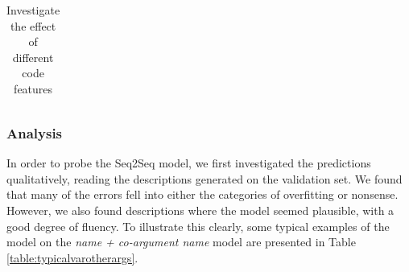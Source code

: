 \begin{table}[!ht]
\begin{center}
\begin{tabular}{ c | c | c }
    
    \hline
\end{tabular}
\caption {Investigate the effect of different code features}
\label{table:tokenization}
\end{center}
\end{table}


\subsubsection{Analysis} %
\label{ssub:analysis}

In order to probe the Seq2Seq model, we first investigated the predictions qualitatively, reading the descriptions generated on the validation set. 
We found that many of the errors fell into either the categories of overfitting or nonsense. 
However, we also found descriptions where the model seemed plausible, with a good degree of fluency.
To illustrate this clearly, some typical examples of the model on the \textit{name + co-argument name} model are presented in Table \ref{table:typicalvarotherargs}. 


